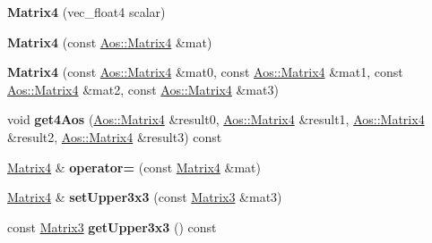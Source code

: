 \begin{DoxyCompactItemize}
\item 
\hypertarget{classVectormath_1_1Soa_1_1Matrix4_af167a23c0213ba518024ecc6bd8bd338}{{\bfseries Matrix4} (vec\-\_\-float4 scalar)}\label{classVectormath_1_1Soa_1_1Matrix4_af167a23c0213ba518024ecc6bd8bd338}

\item 
\hypertarget{classVectormath_1_1Soa_1_1Matrix4_ac3365a909689ae90d54b822779479b9a}{{\bfseries Matrix4} (const \hyperlink{classVectormath_1_1Aos_1_1Matrix4}{Aos\-::\-Matrix4} \&mat)}\label{classVectormath_1_1Soa_1_1Matrix4_ac3365a909689ae90d54b822779479b9a}

\item 
\hypertarget{classVectormath_1_1Soa_1_1Matrix4_a09fb7e3046ffce511f8d505f99650e9a}{{\bfseries Matrix4} (const \hyperlink{classVectormath_1_1Aos_1_1Matrix4}{Aos\-::\-Matrix4} \&mat0, const \hyperlink{classVectormath_1_1Aos_1_1Matrix4}{Aos\-::\-Matrix4} \&mat1, const \hyperlink{classVectormath_1_1Aos_1_1Matrix4}{Aos\-::\-Matrix4} \&mat2, const \hyperlink{classVectormath_1_1Aos_1_1Matrix4}{Aos\-::\-Matrix4} \&mat3)}\label{classVectormath_1_1Soa_1_1Matrix4_a09fb7e3046ffce511f8d505f99650e9a}

\item 
\hypertarget{classVectormath_1_1Soa_1_1Matrix4_aae44182e8d614430b45fad53323f0499}{void {\bfseries get4\-Aos} (\hyperlink{classVectormath_1_1Aos_1_1Matrix4}{Aos\-::\-Matrix4} \&result0, \hyperlink{classVectormath_1_1Aos_1_1Matrix4}{Aos\-::\-Matrix4} \&result1, \hyperlink{classVectormath_1_1Aos_1_1Matrix4}{Aos\-::\-Matrix4} \&result2, \hyperlink{classVectormath_1_1Aos_1_1Matrix4}{Aos\-::\-Matrix4} \&result3) const }\label{classVectormath_1_1Soa_1_1Matrix4_aae44182e8d614430b45fad53323f0499}

\item 
\hypertarget{classVectormath_1_1Soa_1_1Matrix4_aff57d7db758cf4ba670733d309c51851}{\hyperlink{classVectormath_1_1Soa_1_1Matrix4}{Matrix4} \& {\bfseries operator=} (const \hyperlink{classVectormath_1_1Soa_1_1Matrix4}{Matrix4} \&mat)}\label{classVectormath_1_1Soa_1_1Matrix4_aff57d7db758cf4ba670733d309c51851}

\item 
\hypertarget{classVectormath_1_1Soa_1_1Matrix4_a32e25c70c6e45c5e807f2c81ddb5e2c2}{\hyperlink{classVectormath_1_1Soa_1_1Matrix4}{Matrix4} \& {\bfseries set\-Upper3x3} (const \hyperlink{classVectormath_1_1Soa_1_1Matrix3}{Matrix3} \&mat3)}\label{classVectormath_1_1Soa_1_1Matrix4_a32e25c70c6e45c5e807f2c81ddb5e2c2}

\item 
\hypertarget{classVectormath_1_1Soa_1_1Matrix4_abc748bbc84bf29ae195feabc80161ef9}{const \hyperlink{classVectormath_1_1Soa_1_1Matrix3}{Matrix3} {\bfseries get\-Upper3x3} () const }\label{classVectormath_1_1Soa_1_1Matrix4_abc748bbc84bf29ae195feabc80161ef9}


\end{DoxyCompactItemize}
